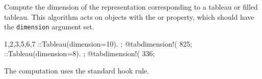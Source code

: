 
Compute the dimension of the representation corresponding to a tableau
or filled tableau. This algorithm acts on objects with
the  or  property, which
should have the {\tt dimension} argument set.
\begin{screen}{1,2,3,5,6,7}
\tableau{#}::Tableau(dimension=10).
;
@tabdimension!(%
825;
\tableau{#}::Tableau(dimension=8).
;
@tabdimension!(%
336;
\end{screen}
The computation uses the standard hook rule.

